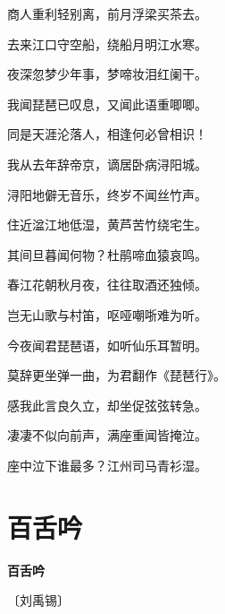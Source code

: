 \documentclass[12pt,UTF-8,openany,fontset=none]{ctexbook}
\begin{document}
\begin{center}
\begin{Large}
        商人重利轻别离，前月浮梁买茶去。

        去来江口守空船，绕船月明江水寒。

        夜深忽梦少年事，梦啼妆泪红阑干。

        我闻琵琶已叹息，又闻此语重唧唧。

        同是天涯沦落人，相逢何必曾相识！

        我从去年辞帝京，谪居卧病浔阳城。

        浔阳地僻无音乐，终岁不闻丝竹声。

        住近湓江地低湿，黄芦苦竹绕宅生。

        其间旦暮闻何物？杜鹃啼血猿哀鸣。

        春江花朝秋月夜，往往取酒还独倾。

        岂无山歌与村笛，呕哑嘲哳难为听。

        今夜闻君琵琶语，如听仙乐耳暂明。

        \hspace{26pt}莫辞更坐弹一曲，为君翻作《琵琶行》。

        感我此言良久立，却坐促弦弦转急。

        凄凄不似向前声，满座重闻皆掩泣。

        座中泣下谁最多？江州司马青衫湿。

    \end{Large}

\end{center}

\vspace{8pt}
\clearpage

\section{百舌吟}


\begin{center}
    {\bfseries 百舌吟}

    \vspace{18pt}

    \begin{large}\xuwen
        〔刘禹锡〕
    \end{large}

\end{center}

    \vspace{18pt}  %
\end{document}
